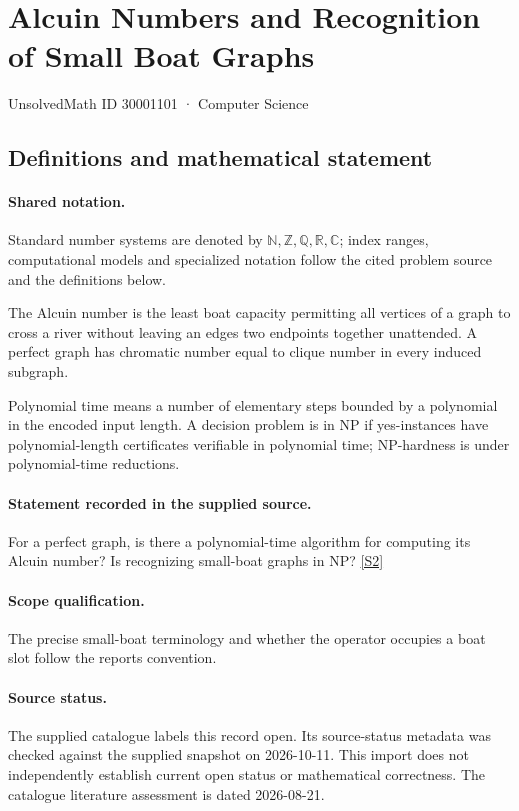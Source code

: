 \documentclass[11pt]{article}
\newcommand{\sref}[2]{\hyperlink{source:#1:#2}{[S#2]}}
\begin{document}
\setcounter{section}{30001100}
\section{Alcuin Numbers and Recognition of Small Boat Graphs}\label{30001101}
{\small\sffamily UnsolvedMath ID 30001101 · Computer Science}
\subsection{Definitions and mathematical statement}

\paragraph{Shared notation.}Standard number systems are denoted by $\mathbb N,\mathbb Z,\mathbb Q,\mathbb R,\mathbb C$; index ranges, computational models and specialized notation follow the cited problem source and the definitions below.


The Alcuin number is the least boat capacity permitting all vertices of a graph to cross a river without leaving an edge\textquotesingle s two endpoints together unattended. A perfect graph has chromatic number equal to clique number in every induced subgraph.

Polynomial time means a number of elementary steps bounded by a polynomial in the encoded input length. A decision problem is in $\mathrm{NP}$ if yes-instances have polynomial-length certificates verifiable in polynomial time; NP-hardness is under polynomial-time reductions.
\paragraph{Statement recorded in the supplied source.}
For a perfect graph, is there a polynomial-time algorithm for computing its Alcuin number? Is recognizing small-boat graphs in NP? \sref{30001101}{2}
\paragraph{Scope qualification.}
The precise small-boat terminology and whether the operator occupies a boat slot follow the report\textquotesingle s convention.
\paragraph{Source status.}
The supplied catalogue labels this record open. Its source-status metadata was checked against the supplied snapshot on 2026-10-11. This import does not independently establish current open status or mathematical correctness. The catalogue literature assessment is dated 2026-08-21.
\end{document}

